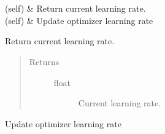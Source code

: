 \documentclass[letterpaper,10pt,english]{sphinxmanual}
\begin{document}
\begin{fulllineitems}
\begin{savenotes}\sphinxatlongtablestart\begin{longtable}{}
\hline

\endfirsthead

%
{}\\
\hline

\endhead

\hline
{}\\
\endfoot

\endlastfoot

{\hyperref[\detokenize{index:methylnet.schedulers.Scheduler.get_lr}]{}}(self)
&
Return current learning rate.
\\
\hline
{\hyperref[\detokenize{index:methylnet.schedulers.Scheduler.step}]{}}(self)
&
Update optimizer learning rate
\\
\hline
\end{longtable}\sphinxatlongtableend\end{savenotes}

\begin{fulllineitems}
\label{\detokenize{index:methylnet.schedulers.Scheduler.get_lr}}
Return current learning rate.
\begin{quote}\begin{description}
\item[{Returns}] \leavevmode\begin{description}
\item[{float}] \leavevmode
Current learning rate.

\end{description}

\end{description}\end{quote}

\end{fulllineitems}


\begin{fulllineitems}
\label{\detokenize{index:methylnet.schedulers.Scheduler.step}}
Update optimizer learning rate

\end{fulllineitems}


\end{fulllineitems}
\end{document}
